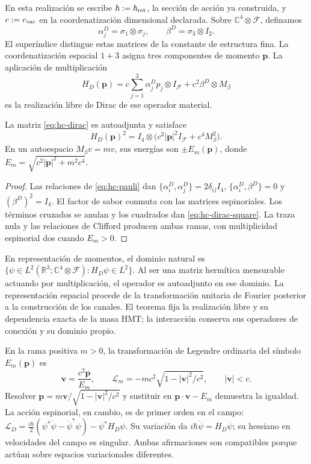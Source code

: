 En esta realización se escribe \(\hbar:=\hbar_{\rm ret}\),
la sección de acción ya construida, y \(c:=c_{\rm vac}\) en la
coordenatización dimensional declarada. Sobre \(\mathbb C^4\otimes\mathcal F\), definamos
\[
 \alpha_j^{D}=\sigma_1\otimes\sigma_j,\qquad
 \beta^D=\sigma_3\otimes I_2.
\]
El superíndice distingue estas matrices de la constante de estructura fina.
La coordenatización espacial \(1+3\) asigna tres componentes de momento
\(\mathbf p\). La aplicación de multiplicación
\begin{equation}
 H_D(\mathbf p)
 =c\sum_{j=1}^3\alpha_j^Dp_j\otimes I_{\mathcal F}
 +c^2\beta^D\otimes M_\beta
 \label{eq:hc-dirac}
\end{equation}
es la realización libre de Dirac de ese operador material.

\begin{theorem}
\label{thm:hc-dirac-square}
La matriz \eqref{eq:hc-dirac} es autoadjunta y satisface
\begin{equation}
 H_D(\mathbf p)^2
 =I_4\otimes\bigl(c^2|\mathbf p|^2I_{\mathcal F}
 +c^4M_\beta^2\bigr).
 \label{eq:hc-dirac-square}
\end{equation}
En un autoespacio \(M_\beta v=m v\), sus energías son
\(\pm E_m(\mathbf p)\), donde
\(E_m=\sqrt{c^2|\mathbf p|^2+m^2c^4}\).
\end{theorem}
\begin{proof}
Las relaciones de \eqref{eq:hc-pauli} dan
\(\{\alpha_i^D,\alpha_j^D\}=2\delta_{ij}I_4\),
\(\{\alpha_i^D,\beta^D\}=0\) y \((\beta^D)^2=I_4\).
El factor de sabor conmuta con las matrices espinoriales.
Los términos cruzados se anulan y los cuadrados dan
\eqref{eq:hc-dirac-square}. La traza nula y las relaciones de Clifford
producen ambas ramas, con multiplicidad espinorial dos cuando \(E_m>0\).
\end{proof}

En representación de momentos, el dominio natural es
\(\{\psi\in L^2(\mathbb R^3;\mathbb C^4\otimes\mathcal F):
H_D\psi\in L^2\}\). Al ser una matriz hermítica mensurable actuando
por multiplicación, el operador es autoadjunto en ese dominio. La
representación espacial procede de la transformación unitaria de Fourier
posterior a la construcción de los canales. El teorema fija la realización
libre y su dependencia exacta de la masa HMT; la interacción conserva sus
operadores de conexión y su dominio propio.

En la rama positiva \(m>0\), la transformación de Legendre ordinaria
del símbolo \(E_m(\mathbf p)\) es
\[
 \mathbf v=\frac{c^2\mathbf p}{E_m},\qquad
 \mathcal L_m=-mc^2\sqrt{1-|\mathbf v|^2/c^2},
 \qquad |\mathbf v|<c.
\]
Resolver \(\mathbf p=m\mathbf v/\sqrt{1-|\mathbf v|^2/c^2}\)
y sustituir en \(\mathbf p\cdot\mathbf v-E_m\) demuestra la
igualdad. La acción espinorial, en cambio, es de primer orden en el campo:
\(\mathcal L_D=\frac{i\hbar}{2}(\psi^*\dot\psi-\dot\psi^*\psi)
-\psi^*H_D\psi\). Su variación da
\(i\hbar\dot\psi=H_D\psi\); su hessiano en velocidades del campo
es singular. Ambas afirmaciones son compatibles porque actúan sobre
espacios variacionales diferentes.


